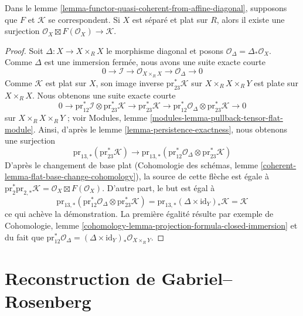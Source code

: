 \begin{lemma}
\label{lemma-functor-quasi-coherent-from-separated}
Dans le lemme \ref{lemma-functor-quasi-coherent-from-affine-diagonal},
supposons que $F$ et $\mathcal{K}$ se correspondent. Si $X$ est séparé et
plat sur $R$, alors il existe une surjection
$\mathcal{O}_X \boxtimes F(\mathcal{O}_X) \to \mathcal{K}$.
\end{lemma}

\begin{proof}
Soit $\Delta : X \to X \times_R X$ le morphisme diagonal et
posons $\mathcal{O}_\Delta = \Delta_*\mathcal{O}_X$.
Comme $\Delta$ est une immersion fermée, nous avons une suite exacte courte
$$
0 \to \mathcal{I} \to 
\mathcal{O}_{X \times_R X} \to \mathcal{O}_\Delta \to 0
$$
Comme $\mathcal{K}$ est plat sur $X$, son image inverse
$\text{pr}_{23}^*\mathcal{K}$ sur $X \times_R X \times_R Y$
est plate sur $X \times_R X$. Nous obtenons une suite exacte courte
$$
0 \to 
\text{pr}_{12}^*\mathcal{I}
\otimes
\text{pr}_{23}^*\mathcal{K} \to
\text{pr}_{23}^*\mathcal{K} \to
\text{pr}_{12}^*\mathcal{O}_\Delta
\otimes
\text{pr}_{23}^*\mathcal{K} \to 0
$$
sur $X \times_R X \times_R Y$ ; voir
Modules, lemme \ref{modules-lemma-pullback-tensor-flat-module}.
Ainsi, d'après le lemme \ref{lemma-persistence-exactness},
nous obtenons une surjection
$$
\text{pr}_{13, *}(\text{pr}_{23}^*\mathcal{K})
\to
\text{pr}_{13, *}(
\text{pr}_{12}^*\mathcal{O}_\Delta
\otimes
\text{pr}_{23}^*\mathcal{K})
$$
D'après le changement de base plat (Cohomologie des schémas, lemme
\ref{coherent-lemma-flat-base-change-cohomology}), la source de cette flèche
est égale à $\text{pr}_2^*\text{pr}_{2, *}\mathcal{K}
= \mathcal{O}_X \boxtimes F(\mathcal{O}_X)$. D'autre part, le but est
égal à
$$
\text{pr}_{13, *}(
\text{pr}_{12}^*\mathcal{O}_\Delta
\otimes
\text{pr}_{23}^*\mathcal{K}) =
\text{pr}_{13, *} (\Delta \times \text{id}_Y)_* \mathcal{K} =
\mathcal{K}
$$
ce qui achève la démonstration. La première égalité résulte par exemple de
Cohomologie, lemme \ref{cohomology-lemma-projection-formula-closed-immersion}
et du fait que $\text{pr}_{12}^*\mathcal{O}_\Delta =
(\Delta \times \text{id}_Y)_*\mathcal{O}_{X \times_R Y}$.
\end{proof}









\section{Reconstruction de Gabriel--Rosenberg}
\label{section-gabriel}

